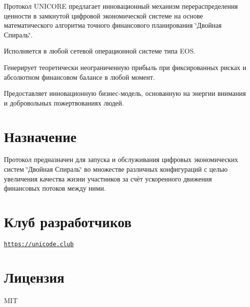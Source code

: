 Протокол U\+N\+I\+C\+O\+RE предлагает инновационный механизм перераспределения ценности в замкнутой цифровой экономической системе на основе математического алгоритма точного финансового планирования \char`\"{}Двойная Спираль\char`\"{}.


\begin{DoxyItemize}
\item Исполняется в любой сетевой операционной системе типа E\+OS.
\item Генерирует теоретически неограниченную прибыль при фиксированных рисках и абсолютном финансовом балансе в любой момент.
\item Предоставляет инновационную бизнес-\/модель, основанную на энергии внимания и добровольных пожертвованиях людей.
\end{DoxyItemize}\hypertarget{index_purpose_sec}{}\section{Назначение}\label{index_purpose_sec}
Протокол предназначен для запуска и обслуживания цифровых экономических систем \char`\"{}Двойная Спираль\char`\"{} во множестве различных конфигураций с целью увеличения качества жизни участников за счёт ускоренного движения финансовых потоков между ними. \hypertarget{index_install_sec}{}\section{Клуб разработчиков}\label{index_install_sec}
\href{https://unicode.club}{\tt https\+://unicode.\+club}\hypertarget{index_licension_sec}{}\section{Лицензия}\label{index_licension_sec}
M\+IT 